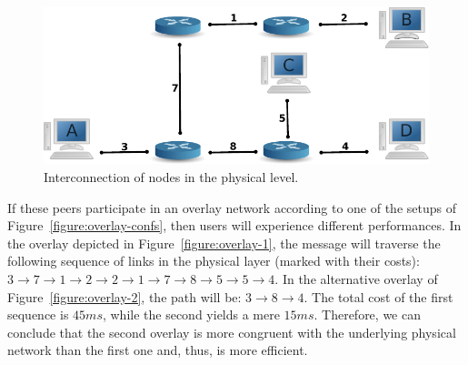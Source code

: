 \begin{figure}
\centering
  \includegraphics[scale=0.8]{img/phys.pdf}
\caption{Interconnection of nodes in the physical level.}
\label{figure:phys}
\end{figure}

If these peers participate in an overlay network according to one of the setups
of Figure~\ref{figure:overlay-confs}, then users will experience different
performances. In the overlay depicted in Figure~\ref{figure:overlay-1}, the
message will traverse the following sequence of links in the physical layer
(marked with their costs): $3 \rightarrow 7 \rightarrow 1 \rightarrow 2
\rightarrow 2 \rightarrow 1 \rightarrow 7 \rightarrow 8 \rightarrow 5
\rightarrow 5 \rightarrow 4$. In the alternative overlay of
Figure~\ref{figure:overlay-2}, the path will be: $3 \rightarrow 8 \rightarrow
4$. The total cost of the first sequence is $45 ms$, while the second yields a
mere $15 ms$. Therefore, we can conclude that the second overlay is more
congruent with the underlying physical network than the first one and, thus, is
more efficient.

